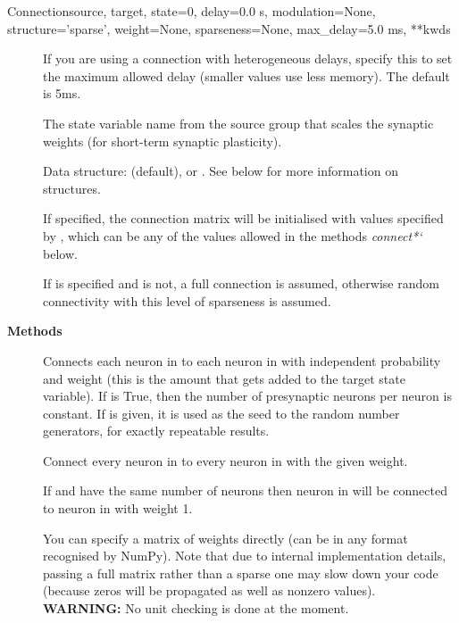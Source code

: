 \documentclass[letterpaper,10pt,english]{manual}
\begin{document}
\begin{classdesc}{Connection}{source, target, state=0, delay=0.0 s, modulation=None, structure='sparse', weight=None, sparseness=None, max\_delay=5.0 ms, **kwds}
\begin{description}
\item[] \leavevmode
If you are using a connection with heterogeneous delays, specify
this to set the maximum allowed delay (smaller values use less
memory). The default is 5ms.

\item[] \leavevmode
The state variable name from the source group that scales
the synaptic weights (for short-term synaptic plasticity).

\item[] \leavevmode
Data structure:  (default),  or
. See below for more information on structures.

\item[] \leavevmode
If specified, the connection matrix will be initialised with
values specified by , which can be any of the values
allowed in the methods \emph{connect*{}`} below.

\item[] \leavevmode
If  is specified and  is not, a full
connection is assumed, otherwise random connectivity with this
level of sparseness is assumed.

\end{description}

\textbf{Methods}
\begin{description}
\item[] \leavevmode
Connects each neuron in  to each neuron in  with independent
probability  and weight  (this is the amount that
gets added to the target state variable). If  is True, then
the number of presynaptic neurons per neuron is constant. If 
is given, it is used as the seed to the random number generators, for
exactly repeatable results.

\item[] \leavevmode
Connect every neuron in  to every neuron in  with the given
weight.

\item[] \leavevmode
If  and  have the same number of neurons then neuron 
in  will be connected to neuron  in  with weight 1.

\item[] \leavevmode
You can specify a matrix of weights directly (can be in any format
recognised by NumPy). Note that due to internal implementation details,
passing a full matrix rather than a sparse one may slow down your code
(because zeros will be propagated as well as nonzero values).
\textbf{WARNING:} No unit checking is done at the moment.


\end{description}
\end{classdesc}
\end{document}
